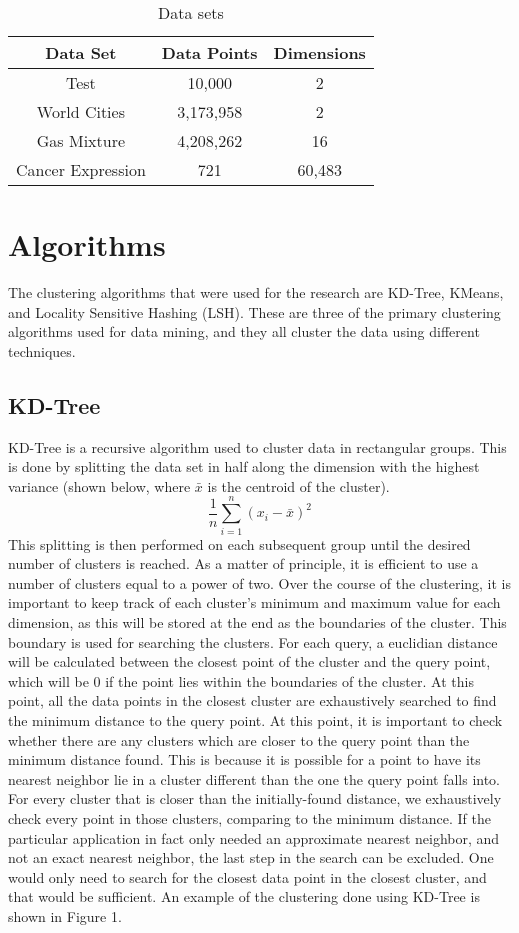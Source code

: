 \documentclass[journal]{IEEEtran}
\begin{document}
\begin{table}[h]
\caption{Data sets}
 \begin{tabular}{||c | c | c||} 
 \hline
 \textbf{Data Set} & \textbf{Data Points} & \textbf{Dimensions}\\ [0.5ex] 
 \hline\hline
 Test & 10,000 & 2 \\ 
 \hline
 World Cities & 3,173,958 & 2\\
 \hline
 Gas Mixture & 4,208,262 & 16\\
 \hline
 Cancer Expression & 721 & 60,483\\
 \hline
\end{tabular}
\end{table}

\section{Algorithms}
The clustering algorithms that were used for the research are KD-Tree, KMeans, and Locality Sensitive Hashing (LSH). These are three of the primary clustering algorithms used for data mining, and they all cluster the data using different techniques.

\subsection{KD-Tree}
KD-Tree is a recursive algorithm used to cluster data in rectangular groups. This is done by splitting the data set in half along the dimension with the highest variance (shown below, where $\bar{x}$ is the centroid of the cluster). 
$$\frac{1}{n}\sum_{i=1}^{n}  (x_i-\bar{x})^2$$
 This splitting is then performed on each subsequent group until the desired number of clusters is reached. As a matter of principle, it is efficient to use a number of clusters equal to a power of two. Over the course of the clustering, it is important to keep track of each cluster's minimum and maximum value for each dimension, as this will be stored at the end as the boundaries of the cluster. This boundary is used for searching the clusters. For each query, a euclidian distance will be calculated between the closest point of the cluster and the query point, which will be 0 if the point lies within the boundaries of the cluster. At this point, all the data points in the closest cluster are exhaustively searched to find the minimum distance to the query point. At this point, it is important to check whether there are any clusters which are closer to the query point than the minimum distance found. This is because it is possible for a point to have its nearest neighbor lie in a cluster different than the one the query point falls into. For every cluster that is closer than the initially-found distance, we exhaustively check every point in those clusters, comparing to the minimum distance. If the particular application in fact only needed an approximate nearest neighbor, and not an exact nearest neighbor, the last step in the search can be excluded. One would only need to search for the closest data point in the closest cluster, and that would be sufficient. An example of the clustering done using KD-Tree is shown in Figure 1.
 
\end{document}
